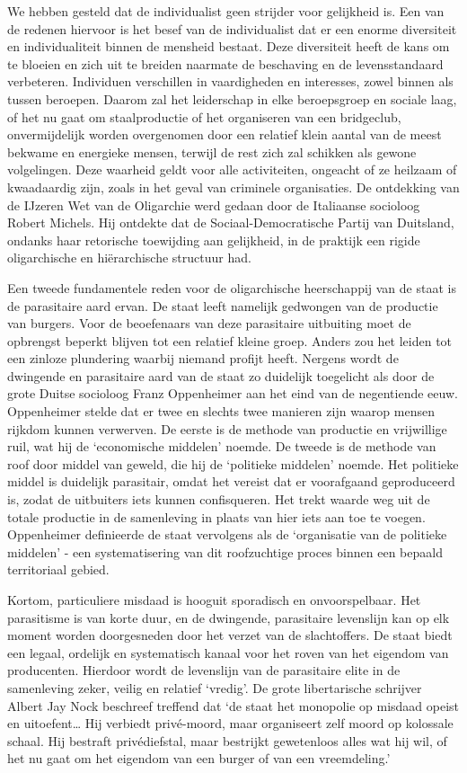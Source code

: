 \documentclass[
  a5paper,
  smalldemyvopaper,10pt,twoside,onecolumn,openright,extrafontsizes,hidelinks]{memoir}
\begin{document}
We hebben gesteld dat de individualist geen strijder voor gelijkheid is.
Een van de redenen hiervoor is het besef van de individualist dat er een
enorme diversiteit en individualiteit binnen de mensheid bestaat. Deze
diversiteit heeft de kans om te bloeien en zich uit te breiden naarmate
de beschaving en de levensstandaard verbeteren. Individuen verschillen
in vaardigheden en interesses, zowel binnen als tussen beroepen. Daarom
zal het leiderschap in elke beroepsgroep en sociale laag, of het nu gaat
om staalproductie of het organiseren van een bridgeclub, onvermijdelijk
worden overgenomen door een relatief klein aantal van de meest bekwame
en energieke mensen, terwijl de rest zich zal schikken als gewone
volgelingen. Deze waarheid geldt voor alle activiteiten, ongeacht of ze
heilzaam of kwaadaardig zijn, zoals in het geval van criminele
organisaties. De ontdekking van de IJzeren Wet van de Oligarchie werd
gedaan door de Italiaanse socioloog Robert Michels. Hij ontdekte dat de
Sociaal-Democratische Partij van Duitsland, ondanks haar retorische
toewijding aan gelijkheid, in de praktijk een rigide oligarchische en
hiërarchische structuur had.

Een tweede fundamentele reden voor de oligarchische heerschappij van de
staat is de parasitaire aard ervan. De staat leeft namelijk gedwongen
van de productie van burgers. Voor de beoefenaars van deze parasitaire
uitbuiting moet de opbrengst beperkt blijven tot een relatief kleine
groep. Anders zou het leiden tot een zinloze plundering waarbij niemand
profijt heeft. Nergens wordt de dwingende en parasitaire aard van de
staat zo duidelijk toegelicht als door de grote Duitse socioloog Franz
Oppenheimer aan het eind van de negentiende eeuw. Oppenheimer stelde dat
er twee en slechts twee manieren zijn waarop mensen rijkdom kunnen
verwerven. De eerste is de methode van productie en vrijwillige ruil,
wat hij de `economische middelen' noemde. De tweede is de methode van
roof door middel van geweld, die hij de `politieke middelen' noemde. Het
politieke middel is duidelijk parasitair, omdat het vereist dat er
voorafgaand geproduceerd is, zodat de uitbuiters iets kunnen
confisqueren. Het trekt waarde weg uit de totale productie in de
samenleving in plaats van hier iets aan toe te voegen. Oppenheimer
definieerde de staat vervolgens als de `organisatie van de politieke
middelen' - een systematisering van dit roofzuchtige proces binnen een
bepaald territoriaal gebied.

Kortom, particuliere misdaad is hooguit sporadisch en onvoorspelbaar.
Het parasitisme is van korte duur, en de dwingende, parasitaire
levenslijn kan op elk moment worden doorgesneden door het verzet van de
slachtoffers. De staat biedt een legaal, ordelijk en systematisch kanaal
voor het roven van het eigendom van producenten. Hierdoor wordt de
levenslijn van de parasitaire elite in de samenleving zeker, veilig en
relatief `vredig'. De grote libertarische schrijver Albert Jay Nock
beschreef treffend dat `de staat het monopolie op misdaad opeist en
uitoefent\ldots{} Hij verbiedt privé-moord, maar organiseert zelf moord
op kolossale schaal. Hij bestraft privédiefstal, maar bestrijkt
gewetenloos alles wat hij wil, of het nu gaat om het eigendom van een
burger of van een vreemdeling.'
\end{document}
